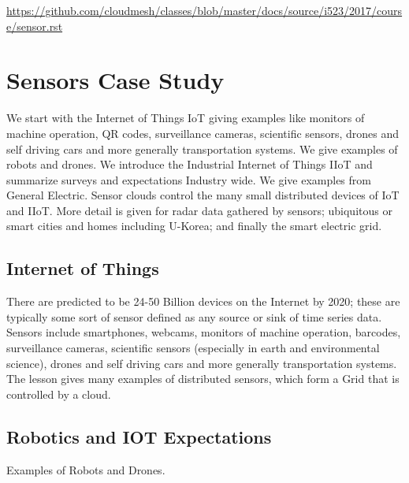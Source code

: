 \begin{fileremark}\url{https://github.com/cloudmesh/classes/blob/master/docs/source/i523/2017/course/sensor.rst}\end{fileremark}
\section{Sensors Case Study}\label{sensors-case-study}

We start with the Internet of Things IoT giving examples like monitors
of machine operation, QR codes, surveillance cameras, scientific
sensors, drones and self driving cars and more generally transportation
systems. We give examples of robots and drones. We introduce the
Industrial Internet of Things IIoT and summarize surveys and
expectations Industry wide. We give examples from General Electric.
Sensor clouds control the many small distributed devices of IoT and
IIoT. More detail is given for radar data gathered by sensors;
ubiquitous or smart cities and homes including U-Korea; and finally the
smart electric grid.



\subsection{Internet of Things}\label{internet-of-things}

There are predicted to be 24-50 Billion devices on the Internet by 2020;
these are typically some sort of sensor defined as any source or sink of
time series data. Sensors include smartphones, webcams, monitors of
machine operation, barcodes, surveillance cameras, scientific sensors
(especially in earth and environmental science), drones and self driving
cars and more generally transportation systems. The lesson gives many
examples of distributed sensors, which form a Grid that is controlled by
a cloud.



\subsection{Robotics and IOT
Expectations}\label{robotics-and-iot-expectations}

Examples of Robots and Drones.

